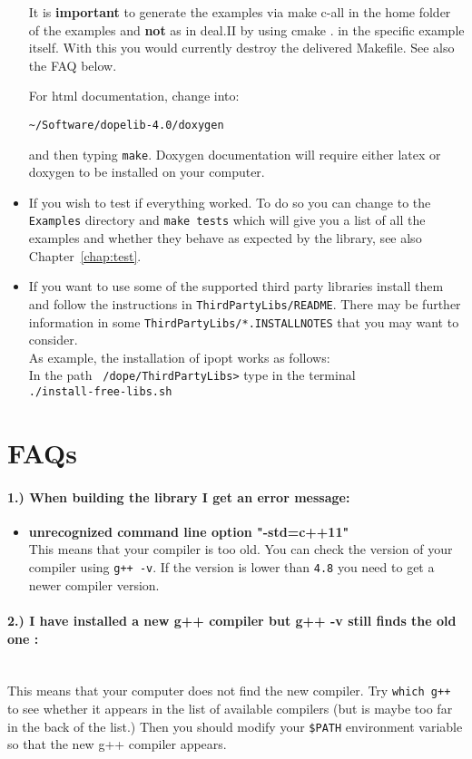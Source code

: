 \begin{itemize}
It is \textbf{important} to generate the examples via make c-all 
in the home folder of the examples and \textbf{not} as in deal.II by 
using cmake . in the specific example itself. With this you
would currently destroy the delivered Makefile. See also the FAQ below.

For html documentation, change into:
\begin{lstlisting}
~/Software/dopelib-4.0/doxygen
\end{lstlisting}
and then typing \texttt{make}. Doxygen documentation
will require either 
latex or doxygen to be installed on your computer.
\item If you wish to test if everything worked. To do so you can 
change to the \texttt{Examples} directory and \texttt{make tests} which will give you a 
list of all the examples and whether they behave as expected by the library, see also 
Chapter~\ref{chap:test}.
\item  If you want to use some of the supported third party libraries install them and follow 
 the instructions in \texttt{ThirdPartyLibs/README}. There may be further information 
 in some \texttt{ThirdPartyLibs/*.INSTALLNOTES} that you may want to
 consider.\\[3mm]
 As example, the installation of ipopt works as follows:\\
In the path \texttt{~/dope/ThirdPartyLibs>} type in the terminal\\
\texttt{./install-free-libs.sh}


\end{itemize}
\section{FAQs}
\paragraph{1.) When building the library I get an error message:}
\begin{itemize}
\item \textbf{unrecognized command line option "-std=c++11"}\\
  This means that your compiler is too old. You can check the 
  version of your compiler using \texttt{g++ -v}. If the version is lower than
  \texttt{4.8} you need to get a newer compiler version.
\end{itemize}

\paragraph{2.) I have installed a new g++ compiler but g++ -v still finds the old one :}
\ \\
  This means that your computer does not find the new compiler. Try
  \texttt{which g++} to see whether it appears in the list of available 
  compilers (but is maybe too far in the back of the list.) Then you should 
  modify your \texttt{\$PATH} environment variable so that the new g++ compiler
  appears.

